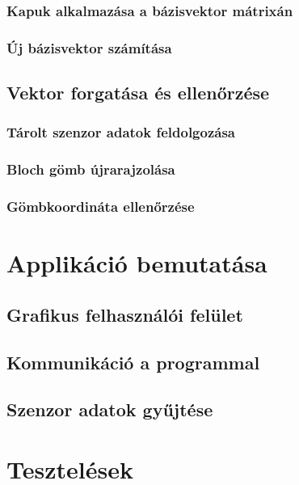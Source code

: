 \documentclass[
]{thesis-ekf}
\theoremstyle{definition}
\theoremstyle{remark}
\begin{document}
\subsubsection{Kapuk alkalmazása a bázisvektor mátrixán}

\subsubsection{Új bázisvektor számítása}

\subsection{Vektor forgatása és ellenőrzése}
\subsubsection{Tárolt szenzor adatok feldolgozása}

\subsubsection{Bloch gömb újrarajzolása}

\subsubsection{Gömbkoordináta ellenőrzése}

\section{Applikáció bemutatása}

\subsection{Grafikus felhasználói felület}

\subsection{Kommunikáció a programmal}

\subsection{Szenzor adatok gyűjtése}

\section{Tesztelések}
\end{document}

